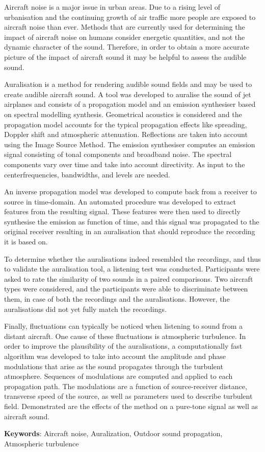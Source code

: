 Aircraft noise is a major issue in urban areas. Due to a rising level of
urbanisation and the continuing growth of air traffic more people are exposed to
aircraft noise than ever. Methods that are currently used for determining the
impact of aircraft noise on humans consider energetic quantities, and not the
dynamic character of the sound. Therefore, in order to obtain a more accurate
picture of the impact of aircraft sound it may be helpful to assess the audible
sound.

Auralisation is a method for rendering audible sound fields and may be used to
create audible aircraft sound. A tool was developed to auralise the sound of jet
airplanes and consists of a propagation model and an emission synthesiser based
on spectral modelling synthesis. Geometrical acoustics is considered and the
propagation model accounts for the typical propagation effects like spreading,
Doppler shift and atmospheric attenuation. Reflections are taken into account
using the Image Source Method.
The emission synthesiser computes an emission signal consisting of tonal
components and broadband noise. The spectral components vary over time and take
into account directivity. As input to the centerfrequencies, bandwidths, and
levels are needed.

An inverse propagation model was developed to compute back from a receiver to
source in time-domain. An automated procedure was developed to extract features
from the resulting signal. These features were then used to directly synthesise
the emission as function of time, and this signal was propagated to the original
receiver resulting in an auralisation that should reproduce the recording
it is based on.

To determine whether the auralisations indeed resembled the recordings, and thus
to validate the auralisation tool, a listening test was conducted. Participants
were asked to rate the similarity of two sounds in a paired comparisons. Two
aircraft types were considered, and the participants were able to
discriminate between them, in case of both the recordings and the auralisations.
However, the auralisations did not yet fully match the recordings.

Finally, fluctuations can typically be noticed when listening to sound from a
distant aircraft. One cause of these fluctuations is atmospheric turbulence. In
order to improve the plausibility of the auralisations, a
computationally fast algorithm was developed to take into account the amplitude
and phase modulations that arise as the sound propagates through the turbulent
atmosphere. Sequences of modulations are computed and applied to each
propagation path. The modulations are a function of source-receiver distance,
transverse speed of the source, as well as parameters used to describe turbulent
field. Demonstrated are the effects of the method on a
pure-tone signal as well as aircraft sound.



\vspace{0.1cm}

\textbf{Keywords}: Aircraft noise, Auralization, Outdoor sound propagation, Atmospheric turbulence
